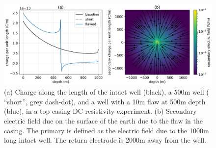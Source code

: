 \begin{figure}
    \begin{center}
    \includegraphics[width=\textwidth]{figures/dc_casing/casing_charge.png}
    \end{center}
\caption{
    (a) Charge along the length of the intact well (black),
    a 500m well ( ``short'', grey dash-dot), and
    a well with a 10m flaw at 500m depth (blue),
    in a top-casing DC resistivity experiment.
    (b) Secondary electric field due on the surface of the earth due to the
    flaw in the casing. The primary is
    defined as the electric field due to the 1000m long intact well. The return electrode
    is 2000m away from the well.
}
\label{fig:casing_charge}
\end{figure}
